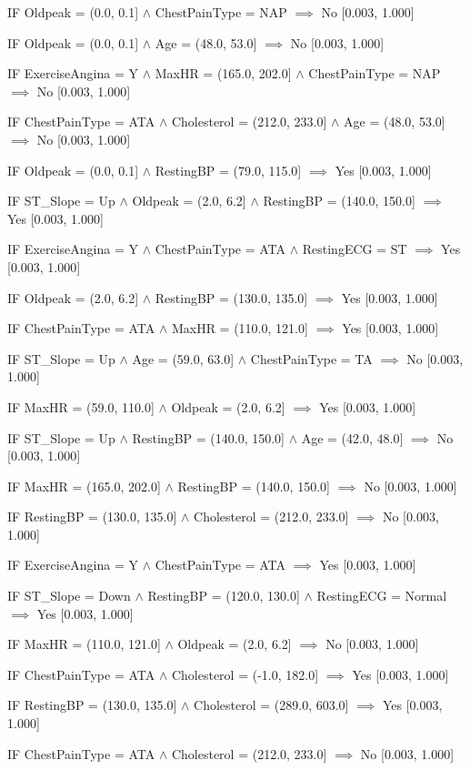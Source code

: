 IF Oldpeak = (0.0, 0.1] $\land$ ChestPainType = NAP $\implies$ No [0.003, 1.000]

IF Oldpeak = (0.0, 0.1] $\land$ Age = (48.0, 53.0] $\implies$ No [0.003, 1.000]

IF ExerciseAngina = Y $\land$ MaxHR = (165.0, 202.0] $\land$ ChestPainType = NAP $\implies$ No [0.003, 1.000]

IF ChestPainType = ATA $\land$ Cholesterol = (212.0, 233.0] $\land$ Age = (48.0, 53.0] $\implies$ No [0.003, 1.000]

IF Oldpeak = (0.0, 0.1] $\land$ RestingBP = (79.0, 115.0] $\implies$ Yes [0.003, 1.000]

IF ST_Slope = Up $\land$ Oldpeak = (2.0, 6.2] $\land$ RestingBP = (140.0, 150.0] $\implies$ Yes [0.003, 1.000]

IF ExerciseAngina = Y $\land$ ChestPainType = ATA $\land$ RestingECG = ST $\implies$ Yes [0.003, 1.000]

IF Oldpeak = (2.0, 6.2] $\land$ RestingBP = (130.0, 135.0] $\implies$ Yes [0.003, 1.000]

IF ChestPainType = ATA $\land$ MaxHR = (110.0, 121.0] $\implies$ Yes [0.003, 1.000]

IF ST_Slope = Up $\land$ Age = (59.0, 63.0] $\land$ ChestPainType = TA $\implies$ No [0.003, 1.000]

IF MaxHR = (59.0, 110.0] $\land$ Oldpeak = (2.0, 6.2] $\implies$ Yes [0.003, 1.000]

IF ST_Slope = Up $\land$ RestingBP = (140.0, 150.0] $\land$ Age = (42.0, 48.0] $\implies$ No [0.003, 1.000]

IF MaxHR = (165.0, 202.0] $\land$ RestingBP = (140.0, 150.0] $\implies$ No [0.003, 1.000]

IF RestingBP = (130.0, 135.0] $\land$ Cholesterol = (212.0, 233.0] $\implies$ No [0.003, 1.000]

IF ExerciseAngina = Y $\land$ ChestPainType = ATA $\implies$ Yes [0.003, 1.000]

IF ST_Slope = Down $\land$ RestingBP = (120.0, 130.0] $\land$ RestingECG = Normal $\implies$ Yes [0.003, 1.000]

IF MaxHR = (110.0, 121.0] $\land$ Oldpeak = (2.0, 6.2] $\implies$ No [0.003, 1.000]

IF ChestPainType = ATA $\land$ Cholesterol = (-1.0, 182.0] $\implies$ Yes [0.003, 1.000]

IF RestingBP = (130.0, 135.0] $\land$ Cholesterol = (289.0, 603.0] $\implies$ Yes [0.003, 1.000]

IF ChestPainType = ATA $\land$ Cholesterol = (212.0, 233.0] $\implies$ No [0.003, 1.000]

